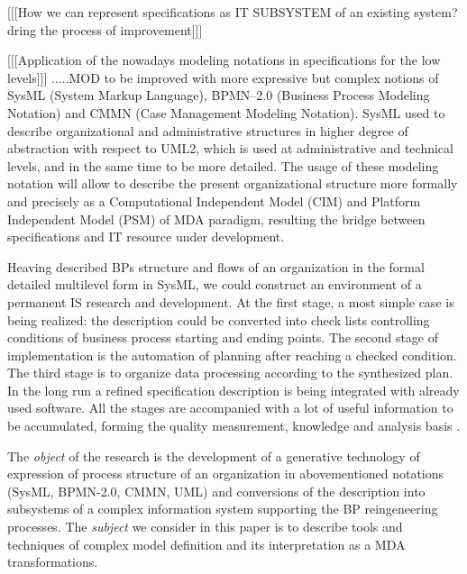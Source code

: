 \documentclass[12pt,a4paper]{llncs}
\begin{document}
[[[How we can represent specifications as IT SUBSYSTEM of an existing system? dring the process of improvement]]]

[[[Application of the nowadays modeling notations in specifications for the low levels]]]
.....MOD to be improved with more expressive but complex notions of SysML (System Markup Language), BPMN--2.0 (Business Process Modeling Notation) and CMMN (Case Management Modeling Notation).  SysML used to describe organizational and administrative structures in higher degree of abstraction with respect to UML2, which is used at administrative and technical levels, and in the same time to be more detailed.  The usage of these modeling notation will allow to describe the present organizational structure more formally and precisely as a Computational Independent Model (CIM) and Platform Independent Model (PSM) of MDA paradigm, resulting the bridge between specifications and IT resource under development.

Heaving described BPs structure and flows of an organization in the formal detailed multilevel form in SysML, we could construct an environment of a permanent IS research and development.  At the first stage, a most simple case is being realized: the description could be converted into check lists controlling conditions of business process starting and ending points. The second stage of implementation is the automation of planning after reaching a checked condition.  The third stage is to organize data processing according to the synthesized plan.  In the long run a refined specification description is being integrated with already used software.  All the stages are accompanied with a lot of useful information to be accumulated, forming the quality measurement, knowledge and analysis basis \cite{aiowa}.


The \emph{object} of the research is the development of a generative technology \cite{} of expression of process structure of an organization in abovementioned notations (SysML, BPMN-2.0, CMMN, UML) and conversions of the description into subsystems of a complex information system supporting the BP reingeneering processes. The \emph{subject} we consider in this paper is to describe tools and techniques of complex model definition and its interpretation as a MDA transformations.
\end{document}
